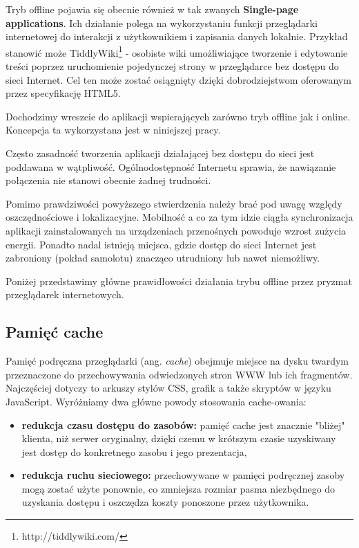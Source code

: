 Tryb offline pojawia się obecnie również w tak zwanych \textbf{Single-page applications}. Ich działanie polega na wykorzystaniu funkcji przeglądarki internetowej do interakcji z użytkownikiem i zapisania danych lokalnie. Przykład stanowić może TiddlyWiki\footnote{http://tiddlywiki.com/} - osobiste wiki umożliwiające tworzenie i edytowanie treści poprzez uruchomienie pojedynczej strony w przeglądarce bez dostępu do sieci Internet. Cel ten może zostać osiągnięty dzięki dobrodziejstwom oferowanym przez specyfikację HTML5.

Dochodzimy wreszcie do aplikacji wspierających zarówno tryb offline jak i online. Koncepcja ta wykorzystana jest w niniejszej pracy.

Często zasadność tworzenia aplikacji działającej bez dostępu do sieci jest poddawana w wątpliwość. Ogólnodostępność Internetu sprawia, że nawiązanie połączenia nie stanowi obecnie żadnej trudności.

Pomimo prawdziwości powyższego stwierdzenia należy brać pod uwagę względy oszczędnościowe i lokalizacyjne. Mobilność a co za tym idzie ciągła synchronizacja aplikacji zainstalowanych na urządzeniach przenośnych powoduje wzrost zużycia energii. Ponadto nadal istnieją miejsca, gdzie dostęp do sieci Internet jest zabroniony (pokład samolotu) znacząco utrudniony lub nawet niemożliwy.

Poniżej przedstawimy główne prawidłowości działania trybu offline przez pryzmat przeglądarek internetowych.

\subsection{Pamięć cache}
\label{sec:pamiecCache}

Pamięć podręczna przeglądarki\cite{pamiecPodreczna} (ang. \emph{cache}) obejmuje miejsce na dysku twardym przeznaczone do przechowywania odwiedzonych stron WWW lub ich fragmentów. Najczęściej dotyczy to arkuszy stylów CSS, grafik a także skryptów w języku JavaScript. Wyróżniamy dwa główne powody stosowania cache-owania:

\begin{itemize}
\item \textbf{redukcja czasu dostępu do zasobów:} pamięć cache jest znacznie "bliżej"{} klienta, niż serwer oryginalny, dzięki czemu w krótszym czasie uzyskiwany jest dostęp do konkretnego zasobu i jego prezentacja,
\item \textbf{redukcja ruchu sieciowego:} przechowywane w pamięci podręcznej zasoby mogą zostać użyte ponownie, co zmniejsza rozmiar pasma niezbędnego do uzyskania dostępu i oszczędza koszty ponoszone przez użytkownika.
\end{itemize}


